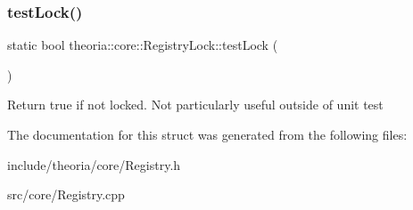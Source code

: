 \subsubsection{\texorpdfstring{test\+Lock()}{testLock()}}
{\footnotesize\ttfamily static bool theoria\+::core\+::\+Registry\+Lock\+::test\+Lock (\begin{DoxyParamCaption}{ }\end{DoxyParamCaption})\hspace{0.3cm}{\ttfamily [static]}}

Return true if not locked. Not particularly useful outside of unit test 

The documentation for this struct was generated from the following files\+:\begin{DoxyCompactItemize}
\item 
include/theoria/core/Registry.\+h\item 
src/core/Registry.\+cpp\end{DoxyCompactItemize}
